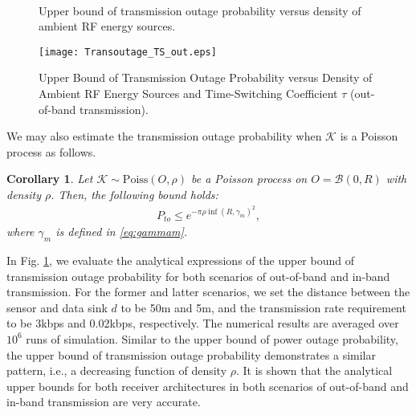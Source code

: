 \documentclass[12pt,draftclsnofoot,onecolumn]{IEEEtran}
\newtheorem{corollary}{Corollary}
\begin{document}
\begin{figure} 
\centering
{} 
\centering
{} \\
\centering
\caption{Upper bound of transmission outage probability versus density of ambient RF energy sources.}
\label{fig:trans_outage}
\end{figure}    
    
    
\begin{figure}
\centering
\texttt{[image: Transoutage\_TS\_out.eps]}
\caption{Upper Bound of Transmission Outage Probability versus Density of Ambient RF Energy Sources and Time-Switching Coefficient $\tau$ (out-of-band transmission).} \label{fig:Transoutage_TS_out}
\end{figure}    
    

We may also estimate the transmission outage probability when $\mathcal{K}$ is a Poisson process as follows.
\begin{corollary}
Let $\mathcal{K}\sim\mathrm{Poiss}(O,\rho)$ be a Poisson process on $O=\mathcal{B}(0,R)$ with density $\rho$. Then, the following bound holds:
\begin{eqnarray}
	P_{to} \le e^{-\pi\rho\inf(R,\gamma_m)^2},
\end{eqnarray}
where $\gamma_m$ is defined in \eqref{eq:gammam}. 
\end{corollary}
 
In Fig. \ref{fig:trans_outage}, we evaluate the analytical expressions of the upper bound of transmission outage probability for both scenarios of out-of-band and in-band transmission. For the former and latter scenarios, we set the distance between the sensor and data sink $d$ to be 50m and 5m, and the transmission rate requirement to be 3kbps and 0.02kbps, respectively. The numerical results are averaged over $10^{6}$ runs of simulation. Similar to the upper bound of power outage probability, the upper bound of transmission outage probability demonstrates a similar pattern, i.e., a decreasing function of density $\rho$. It is shown that the analytical upper bounds for both receiver architectures in both scenarios of out-of-band and in-band transmission are very accurate.
 
\end{document}
